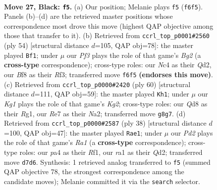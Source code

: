 \documentclass[11pt]{article}
\begin{document}
\clearpage

\begin{figure}[p]\centering
\begin{subfigure}{0.46\textwidth}\centering
\resizebox{\linewidth}{!}{%
\newchessgame
\chessboard[
  setfen={2bq1bk1/rp1pr2p/p3pp2/2P4Q/P1nP2BP/2N2N2/1P3PK1/R1B2R2 b - - 0 27},
  showmover=false,
  pgfstyle=straightmove, color=movearrow, markmove={f6-f5}
]}
\caption{}
\end{subfigure}\hfill
\begin{subfigure}{0.46\textwidth}\centering
\resizebox{\linewidth}{!}{%
\newchessgame
\chessboard[
  setfen={3q2rk/1p3ppp/2n1p3/pb1pP2N/3P1BPb/P4R1P/1P1Q1PB1/6K1 w - - 2 28},
  showmover=false,
  pgfstyle=straightmove, color=movearrow, markmove={g2-f1}
]}
\caption{}
\end{subfigure}
\\[4pt]
\begin{subfigure}{0.46\textwidth}\centering
\resizebox{\linewidth}{!}{%
\newchessgame
\chessboard[
  setfen={2r3k1/2rnqpp1/3b3p/1p1PpP2/bP2P2P/3B2P1/NR2QBK1/6R1 w - - 1 31},
  showmover=false,
  pgfstyle=straightmove, color=movearrow, markmove={g2-h1}
]}
\caption{}
\end{subfigure}\hfill
\begin{subfigure}{0.46\textwidth}\centering
\resizebox{\linewidth}{!}{%
\newchessgame
\chessboard[
  setfen={4k2r/1prnbpp1/p2p2q1/N2Ppb1p/P6P/2P1BPP1/1P1QB2K/R4R2 w k - 1 20},
  showmover=false,
  pgfstyle=straightmove, color=movearrow, markmove={a1-e1}
]}
\caption{}
\end{subfigure}
\caption{\textbf{Move 27, Black: \texttt{f5}.} (a) Our position; Melanie plays \texttt{f5} (\texttt{f6f5}). Panels (b)--(d) are the retrieved master positions whose correspondence most drove this move (highest QAP objective among those that transfer to it). (b) Retrieved from \texttt{ccrl\_top\_p0001\#2560} (ply 54) [structural distance $d$=105, QAP obj=78]: the master played \texttt{Bf1}; under $\mu$ our \emph{Pf3} plays the role of that game's \emph{Bg2} (a \textbf{cross-type} correspondence); cross-type roles: our \emph{N}c4 as their \emph{Q}d2, our \emph{B}f8 as their \emph{R}f3; transferred move \texttt{f6f5} \textbf{(endorses this move)}. (c) Retrieved from \texttt{ccrl\_top\_p0000\#2420} (ply 60) [structural distance $d$=111, QAP obj=59]: the master played \texttt{Kh1}; under $\mu$ our \emph{Kg1} plays the role of that game's \emph{Kg2}; cross-type roles: our \emph{Q}d8 as their \emph{R}g1, our \emph{R}e7 as their \emph{N}a2; transferred move \texttt{g8g7}. (d) Retrieved from \texttt{ccrl\_top\_p0000\#2587} (ply 38) [structural distance $d$=100, QAP obj=47]: the master played \texttt{Rae1}; under $\mu$ our \emph{Pd2} plays the role of that game's \emph{Ra1} (a \textbf{cross-type} correspondence); cross-type roles: our \emph{p}a4 as their \emph{R}f1, our \emph{r}a1 as their \emph{Q}d2; transferred move \texttt{d7d6}. Synthesis: 1 retrieved analog transferred to \texttt{f5} (summed QAP objective 78, the strongest correspondence among the candidate moves); Melanie committed it via the \texttt{search} selector.}
\label{fig:thought-m53}
\end{figure}
\end{document}
